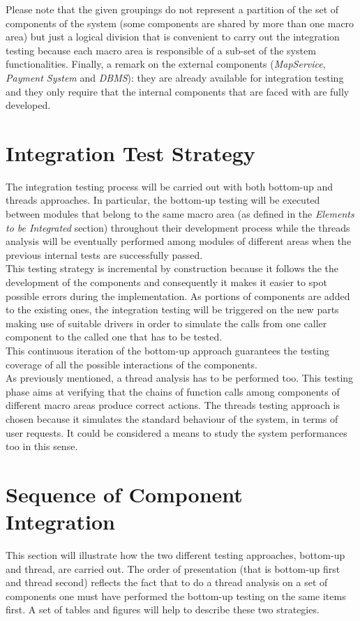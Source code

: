 \documentclass[11pt,a4paper]{report}
\begin{document}
Please note that the given groupings do not represent a partition of the set of components of the system (some components are shared by more than one macro area) but just a logical division that is convenient to carry out the integration testing because each macro area is responsible of a sub-set of the system functionalities. 
Finally, a remark on the external components (\textit{MapService}, \textit{Payment System} and \textit{DBMS}): they are already available for integration testing and they only require that the internal components that are faced with are fully developed.
\section{Integration Test Strategy}
The integration testing process will be carried out with both bottom-up and threads approaches. In particular, the bottom-up testing will be executed between modules that belong to the same macro area (as defined in the \textit{Elements to be Integrated} section) throughout their development process while the threads analysis will be eventually performed among modules of different areas when the previous internal tests are successfully passed.\\
This testing strategy is incremental by construction because it follows the the development of the components and consequently it makes it easier to spot possible errors during the implementation. As portions of components are added to the existing ones, the integration testing will be triggered on the new parts making use of suitable drivers in order to simulate the calls from one caller component to the called one that has to be tested.\\
This continuous iteration of the bottom-up approach guarantees the testing coverage of all the possible interactions of the components.\\
As previously mentioned, a thread analysis has to be performed too. This testing phase aims at verifying that the chains of function calls among components of different macro areas produce correct actions. The threads testing approach is chosen because it simulates the standard behaviour of the system, in terms of user requests. It could be considered a means to study the system performances too in this sense.
\section{Sequence of Component Integration}
This section will illustrate how the two different testing approaches, bottom-up and thread, are carried out. The order of presentation (that is bottom-up first and thread second) reflects the fact that to do a thread analysis on a set of components one must have performed the bottom-up testing on the same items first.
A set of tables and figures will help to describe these two strategies.
\end{document}
